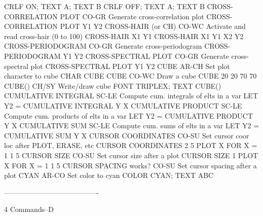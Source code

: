                                   CRLF ON; TEXT A; TEXT B
                                  CRLF OFF; TEXT A; TEXT B
CROSS-CORRELATION PLOT      CO-GR Generate cross-correlation plot
                                  CROSS-CORRELATION PLOT Y1 Y2
CROSS-HAIR (or CH)          CO-WC Activate and read cross-hair (0 to 100)
                                  CROSS-HAIR X1 Y1
                                  CROSS-HAIR X1 Y1 X2 Y2
CROSS-PERIODOGRAM           CO-GR Generate cross-periodogram
                                  CROSS-PERIODOGRAM Y1 Y2
CROSS-SPECTRAL PLOT         CO-GR Generate cross-spectral plot
                                  CROSS-SPECTRAL PLOT Y1 Y2
CUBE                        AR-CH Set plot character to cube
                                  CHAR CUBE
CUBE                        CO-WC Draw a cube
                                  CUBE 20 20 70 70
CUBE()                      CH/SY Write/draw cube
                                  FONT TRIPLEX; TEXT CUBE()
CUMULATIVE INTEGRAL         SC-LE Compute cum. integrals of elts in a var
                                  LET Y2 = CUMULATIVE INTEGRAL Y X
CUMULATIVE PRODUCT          SC-LE Compute cum. products of elts in a var
                                  LET Y2 = CUMULATIVE PRODUCT Y X
CUMULATIVE SUM              SC-LE Compute cum. sums of elts in a var
                                  LET Y2 = CUMULATIVE SUM Y X
CURSOR COORDINATES          CO-SU Set cursor coor loc after PLOT, ERASE, etc
                                  CURSOR COORDINATES 2 5
                                  PLOT X FOR X = 1 1 5
CURSOR SIZE                 CO-SU Set cursor size after a plot
                                  CURSOR SIZE 1
                                  PLOT X FOR X = 1 1 5
CURSOR SPACING works?       CO-SU Set cursor spacing after a plot
CYAN                        AR-CO Set color to cyan
                                  COLOR CYAN; TEXT ABC
 
----------------------------------------
 
4
Commands--D
 
